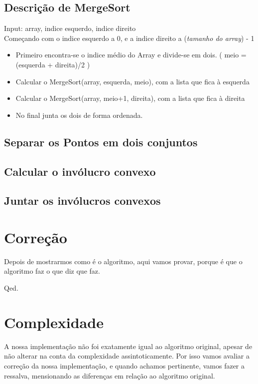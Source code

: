 \documentclass[11pt]{article}
\begin{document}
\subsection{Descrição de MergeSort}
Input: array, indice esquerdo, indice direito\\

Começando com o indice esquerdo a 0, e a indice direito a (\textit{tamanho do array}) - 1
\begin{itemize}
    \item Primeiro encontra-se o indice médio do Array e divide-se em dois. ( meio = (esquerda + direita)/2 )
    \item Calcular o MergeSort(array, esquerda, meio), com a lista que fica à esquerda 
    \item Calcular o MergeSort(array, meio+1, direita), com a lista que fica à direita
    \item No final junta os dois de forma ordenada.
\end{itemize}

\subsection{ Separar os Pontos em dois conjuntos}

\subsection{ Calcular o invólucro convexo } 

\subsection{ Juntar os invólucros convexos } 


\section{Correção}
Depois de mostrarmos como é o algoritmo,
aqui vamos provar, porque é que o algoritmo faz o que diz que faz.\\

\vspace{.5cm}

Qed.

\section{Complexidade}
A nossa implementação não foi exatamente igual ao algoritmo original,
apesar de não alterar na conta da complexidade assintoticamente.
Por isso vamos avaliar a correção da nossa implementação, e quando 
achamos pertinente, vamos fazer a ressalva, mensionando as diferenças 
em relação ao algoritmo original.
\end{document}
